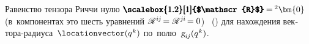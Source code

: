 \begin{otherlanguage}{russian}
Равенство тензора Риччи нулю
${\hspace{.1ex}\pmb{\scalebox{1.2}[1]{$\mathscr{R}$}} \hspace{-0.16ex} = \hspace{-0.2ex} {^2\bm{0}}}$ (в~компонентах это шесть уравнений ${\hspace{.1ex}\mathscr{R}^{\hspace{.1ex}i\hspace{-0.1ex}j} \hspace{-0.3ex} = \mathscr{R}^{\hspace{.1ex}j\hspace{-0.06ex}i} \hspace{-0.3ex} = 0}$)  \textcolor{magenta}{}  ~() для нахождения вектора-радиуса~${\locationvector(q^{\hspace{.1ex}k})}$ по~полю~${\textsl{g}_{i\hspace{-0.1ex}j}(q^{\hspace{.1ex}k})}$.

\end{otherlanguage}

\section*{\small \wordforbibliography}

